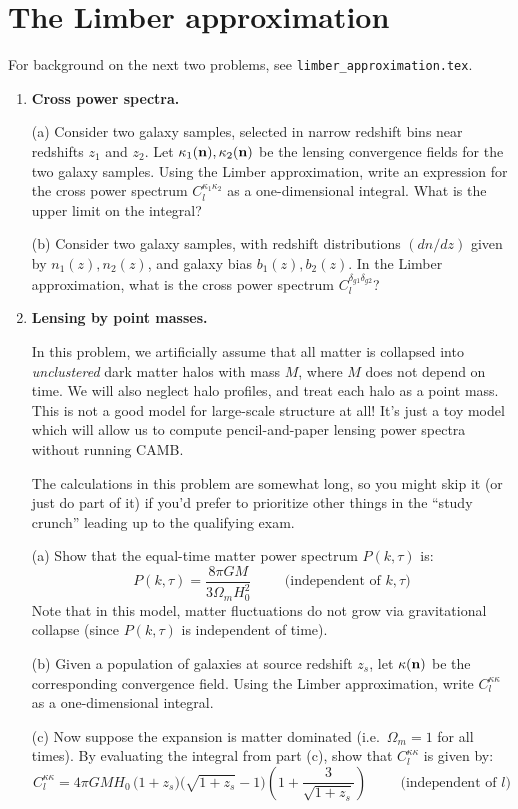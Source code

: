 \documentclass[aps,prd,superscriptaddress,groupedaddress,nofootinbib,nobibnotes]{revtex4}
\newcommand{\be}{\begin{equation}}
\newcommand{\ee}{\end{equation}}
\def\n{{\bf n}}
\begin{document}
\section{The Limber approximation}
\label{sec:limber}

\par\noindent
For background on the next two problems, see {\tt limber\_approximation.tex}.

\begin{enumerate}

\item
{\bf Cross power spectra.}

(a) Consider two galaxy samples, selected in narrow redshift bins near redshifts $z_1$ and $z_2$.
Let $\kappa_1(\n), \kappa_2(\n)$ be the lensing convergence fields for the two galaxy samples.
Using the Limber approximation, write an expression for the cross power spectrum $C_l^{\kappa_1\kappa_2}$
as a one-dimensional integral.  What is the upper limit on the integral?

(b) Consider two galaxy samples, with redshift distributions $(dn/dz)$ given by $n_1(z), n_2(z)$,
and galaxy bias $b_1(z), b_2(z)$.  In the Limber approximation, what is the cross power spectrum
$C_l^{\delta_{g1} \delta_{g2}}$?

\item
{\bf Lensing by point masses.}

In this problem, we artificially assume that all matter is collapsed into {\em unclustered}
dark matter halos with mass $M$, where $M$ does not depend on time.  We will also neglect
halo profiles, and treat each halo as a point mass.  This is not a good model
for large-scale structure at all!  It's just a toy model which will allow us to
compute pencil-and-paper lensing power spectra without running CAMB.

The calculations in this problem are somewhat long, so you might skip it (or just do part of it)
if you'd prefer to prioritize other things in the ``study crunch'' leading up to the
qualifying exam.

(a)
Show that the equal-time matter power spectrum $P(k,\tau)$ is:
\be
P(k,\tau) = \frac{8 \pi G M}{3 \Omega_m H_0^2}  \hspace{1cm} \mbox{(independent of $k,\tau$)}
\ee
Note that in this model, matter fluctuations do not grow via gravitational collapse
(since $P(k,\tau)$ is independent of time).

(b)
Given a population of galaxies at source redshift $z_s$, let $\kappa(\n)$
be the corresponding convergence field.  Using the Limber approximation, write
$C_l^{\kappa\kappa}$ as a one-dimensional integral.

(c)
Now suppose the expansion is matter dominated (i.e.~$\Omega_m=1$ for all times).
By evaluating the integral from part (c), show that $C_l^{\kappa\kappa}$ is given by:
\be
C_l^{\kappa\kappa} = 4\pi G M H_0 \, \Big( 1 + z_s \Big) \Big( \sqrt{1+z_s} - 1 \Big) \left( 1 + \frac{3}{\sqrt{1+z_s}} \right)
  \hspace{1cm} \mbox{(independent of $l$)}
\ee

\end{enumerate}
\end{document}
